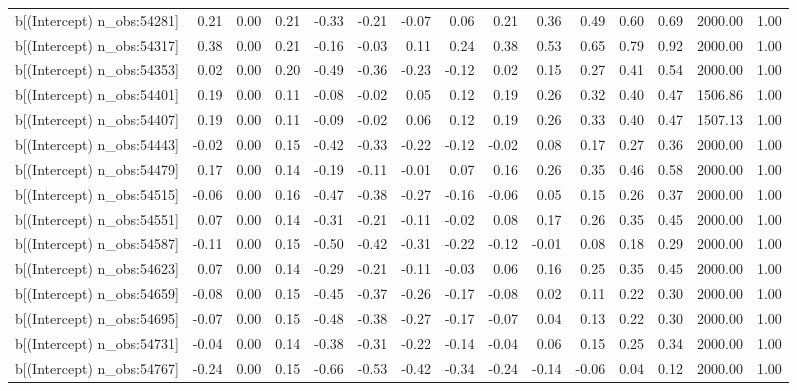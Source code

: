 \begin{table}[ht]
\begin{tabular}{rrrrrrrrrrrrrrr}
  b[(Intercept) n\_obs:54281] & 0.21 & 0.00 & 0.21 & -0.33 & -0.21 & -0.07 & 0.06 & 0.21 & 0.36 & 0.49 & 0.60 & 0.69 & 2000.00 & 1.00 \\ 
  b[(Intercept) n\_obs:54317] & 0.38 & 0.00 & 0.21 & -0.16 & -0.03 & 0.11 & 0.24 & 0.38 & 0.53 & 0.65 & 0.79 & 0.92 & 2000.00 & 1.00 \\ 
  b[(Intercept) n\_obs:54353] & 0.02 & 0.00 & 0.20 & -0.49 & -0.36 & -0.23 & -0.12 & 0.02 & 0.15 & 0.27 & 0.41 & 0.54 & 2000.00 & 1.00 \\ 
  b[(Intercept) n\_obs:54401] & 0.19 & 0.00 & 0.11 & -0.08 & -0.02 & 0.05 & 0.12 & 0.19 & 0.26 & 0.32 & 0.40 & 0.47 & 1506.86 & 1.00 \\ 
  b[(Intercept) n\_obs:54407] & 0.19 & 0.00 & 0.11 & -0.09 & -0.02 & 0.06 & 0.12 & 0.19 & 0.26 & 0.33 & 0.40 & 0.47 & 1507.13 & 1.00 \\ 
  b[(Intercept) n\_obs:54443] & -0.02 & 0.00 & 0.15 & -0.42 & -0.33 & -0.22 & -0.12 & -0.02 & 0.08 & 0.17 & 0.27 & 0.36 & 2000.00 & 1.00 \\ 
  b[(Intercept) n\_obs:54479] & 0.17 & 0.00 & 0.14 & -0.19 & -0.11 & -0.01 & 0.07 & 0.16 & 0.26 & 0.35 & 0.46 & 0.58 & 2000.00 & 1.00 \\ 
  b[(Intercept) n\_obs:54515] & -0.06 & 0.00 & 0.16 & -0.47 & -0.38 & -0.27 & -0.16 & -0.06 & 0.05 & 0.15 & 0.26 & 0.37 & 2000.00 & 1.00 \\ 
  b[(Intercept) n\_obs:54551] & 0.07 & 0.00 & 0.14 & -0.31 & -0.21 & -0.11 & -0.02 & 0.08 & 0.17 & 0.26 & 0.35 & 0.45 & 2000.00 & 1.00 \\ 
  b[(Intercept) n\_obs:54587] & -0.11 & 0.00 & 0.15 & -0.50 & -0.42 & -0.31 & -0.22 & -0.12 & -0.01 & 0.08 & 0.18 & 0.29 & 2000.00 & 1.00 \\ 
  b[(Intercept) n\_obs:54623] & 0.07 & 0.00 & 0.14 & -0.29 & -0.21 & -0.11 & -0.03 & 0.06 & 0.16 & 0.25 & 0.35 & 0.45 & 2000.00 & 1.00 \\ 
  b[(Intercept) n\_obs:54659] & -0.08 & 0.00 & 0.15 & -0.45 & -0.37 & -0.26 & -0.17 & -0.08 & 0.02 & 0.11 & 0.22 & 0.30 & 2000.00 & 1.00 \\ 
  b[(Intercept) n\_obs:54695] & -0.07 & 0.00 & 0.15 & -0.48 & -0.38 & -0.27 & -0.17 & -0.07 & 0.04 & 0.13 & 0.22 & 0.30 & 2000.00 & 1.00 \\ 
  b[(Intercept) n\_obs:54731] & -0.04 & 0.00 & 0.14 & -0.38 & -0.31 & -0.22 & -0.14 & -0.04 & 0.06 & 0.15 & 0.25 & 0.34 & 2000.00 & 1.00 \\ 
  b[(Intercept) n\_obs:54767] & -0.24 & 0.00 & 0.15 & -0.66 & -0.53 & -0.42 & -0.34 & -0.24 & -0.14 & -0.06 & 0.04 & 0.12 & 2000.00 & 1.00 \\ 

\end{tabular}
\end{table}
